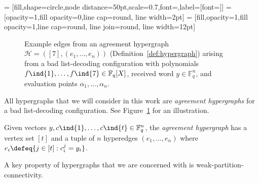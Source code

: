 \documentclass{article}[11pt]
\begin{document}
 = [fill,shape=circle,node distance=50pt,scale=0.7,font=\tiny,label={[font=\tiny]}]
 = [opacity=1,fill opacity=0,line cap=round, line width=2pt]
 = [fill,opacity=1,fill opacity=1,line cap=round, line join=round, line width=12pt]
\newcommand\examplehypergraph{
        \draw (0,0.3) circle (4.5);
        \foreach \i in {1,...,7}{
          \node[vertex,label=above:\(f\ind{\i}\)] (\i) at (360*\i/7:3) {};
        }
        \begin{pgfonlayer}{background}
          \draw[hyperedge,color=green!60!gray!60] (1.center) -- (2.center) -- (4.center)--(1.center);
          \node[] at (-0.5,1) {$e_{n-2}$};
        \draw[hyperedge,color=orange!90!white!80] (6.center) -- (5.center) --(6.center);
        \node[] at (0.75,-2.7) {$e_{n-1}$};
        \draw[hyperedge,color=magenta!90!white!70] (7.center) -- (3.01,0);
        \node[] at (3.5,-0.8) {$e_{n}$};
        \end{pgfonlayer}
}
\begin{figure}[t]
  \begin{center}
    \end{center}
    \caption{Example edges from an agreement hypergraph $\mathcal{H}=([7], (e_1,\dots,e_n))$ (Definition~\ref{def:hypergraph}) arising from a bad list-decoding configuration with polynomials $f\ind{1},\dots,f\ind{7}\in\mathbb{F}_q[X]$, received word $y\in\mathbb{F}_q^n$, and evaluation points $\alpha_1,\dots,\alpha_n$.}
    \label{fig:hypergraph}
  \end{figure}



All hypergraphs that we will consider in this work are \emph{agreement hypergraphs} for a bad list-decoding configuration. See Figure~\ref{fig:hypergraph} for an illustration.
\begin{definition}
  Given vectors $y,c\ind{1},\dots,c\ind{t}\in\mathbb{F}_q^n$, the \emph{agreement hypergraph} has a vertex set $[t]$ and a tuple of $n$ hyperedges $(e_1,\dots,e_n)$ where $e_i \defeq \{j \in [t]: c^j_i = y_i\}$.
  \label{def:hypergraph}
\end{definition}
A key property of hypergraphs that we are concerned with is weak-partition-connectivity. 
\end{document}
